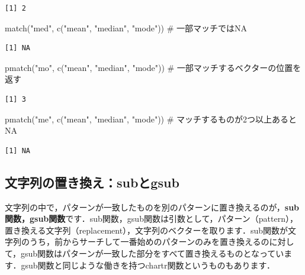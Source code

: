 \documentclass[
  letterpaper,
  DIV=11,
  numbers=noendperiod]{scrreprt}
\newenvironment{Shaded}{\begin{snugshade}}{\end{snugshade}}
\newcommand{\CommentTok}[1]{\textcolor[rgb]{0.37,0.37,0.37}{#1}}
\newcommand{\FunctionTok}[1]{\textcolor[rgb]{0.28,0.35,0.67}{#1}}
\newcommand{\NormalTok}[1]{\textcolor[rgb]{0.00,0.23,0.31}{#1}}
\newcommand{\StringTok}[1]{\textcolor[rgb]{0.13,0.47,0.30}{#1}}
\begin{document}
\begin{verbatim}
[1] 2
\end{verbatim}

\begin{Shaded}
\begin{Highlighting}[]
\FunctionTok{match}\NormalTok{(}\StringTok{"med"}\NormalTok{,   }\FunctionTok{c}\NormalTok{(}\StringTok{"mean"}\NormalTok{, }\StringTok{"median"}\NormalTok{, }\StringTok{"mode"}\NormalTok{)) }\CommentTok{\# 一部マッチではNA}
\end{Highlighting}
\end{Shaded}

\begin{verbatim}
[1] NA
\end{verbatim}

\begin{Shaded}
\begin{Highlighting}[]
\FunctionTok{pmatch}\NormalTok{(}\StringTok{"mo"}\NormalTok{,   }\FunctionTok{c}\NormalTok{(}\StringTok{"mean"}\NormalTok{, }\StringTok{"median"}\NormalTok{, }\StringTok{"mode"}\NormalTok{)) }\CommentTok{\# 一部マッチするベクターの位置を返す}
\end{Highlighting}
\end{Shaded}

\begin{verbatim}
[1] 3
\end{verbatim}

\begin{Shaded}
\begin{Highlighting}[]
\FunctionTok{pmatch}\NormalTok{(}\StringTok{"me"}\NormalTok{,   }\FunctionTok{c}\NormalTok{(}\StringTok{"mean"}\NormalTok{, }\StringTok{"median"}\NormalTok{, }\StringTok{"mode"}\NormalTok{)) }\CommentTok{\# マッチするものが2つ以上あるとNA}
\end{Highlighting}
\end{Shaded}

\begin{verbatim}
[1] NA
\end{verbatim}

\hypertarget{ux6587ux5b57ux5217ux306eux7f6eux304dux63dbux3048subux3068gsub}{%
\subsection{文字列の置き換え：subとgsub}\label{ux6587ux5b57ux5217ux306eux7f6eux304dux63dbux3048subux3068gsub}}

文字列の中で，パターンが一致したものを別のパターンに置き換えるのが，\textbf{sub関数，gsub関数}です．sub関数，gsub関数は引数として，パターン（pattern），置き換える文字列（replacement），文字列のベクターを取ります．sub関数が文字列のうち，前からサーチして一番始めのパターンのみを置き換えるのに対して，gsub関数はパターンが一致した部分をすべて置き換えるものとなっています．gsub関数と同じような働きを持つchartr関数というものもあります．
\end{document}

